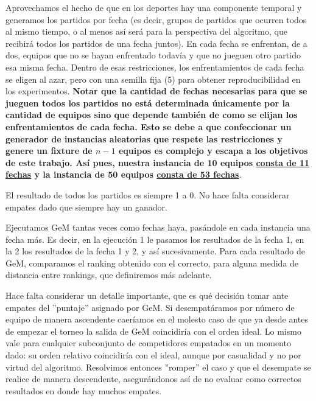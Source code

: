 \begin{LaTeXdescription}
        \par Aprovechamos el hecho de que en los deportes hay una componente
        temporal y generamos los partidos por fecha (es decir, grupos de
        partidos que ocurren todos al mismo tiempo, o al menos as\'i ser\'a para
        la perspectiva del algoritmo, que recibir\'a todos los partidos de una
        fecha juntos). En cada fecha se enfrentan, de a dos, equipos que no se
        hayan enfrentado todav\'ia y que no jueguen otro partido esa misma
        fecha. Dentro de esas restricciones, los enfrentamientos de cada fecha
        se eligen al azar, pero con una semilla fija (5) para obtener
        reproducibilidad en los experimentos. \textbf{Notar que la cantidad de
        fechas necesarias para que se jueguen todos los partidos no est\'a
        determinada \'unicamente por la cantidad de equipos sino que depende
        tambi\'en de como se elijan los enfrentamientos de cada fecha. Esto se
        debe a que confeccionar un generador de instancias aleatorias que
        respete las restricciones y genere un fixture de $n-1$ equipos es
        complejo y escapa a los objetivos de este trabajo. As\'i pues, nuestra
        instancia de 10 equipos \underline{consta de 11 fechas} y la instancia
        de 50 equipos \underline{consta de 53 fechas}}.

        \par El resultado de todos los partidos es siempre 1 a 0. No hace falta
        considerar empates dado que siempre hay un ganador.
        
        \par Ejecutamos
        GeM tantas veces como fechas haya, pas\'andole en cada instancia una
        fecha m\'as. Es decir, en la ejecuci\'on 1 le pasamos los resultados de
        la fecha 1, en la 2 los resultados de la fecha 1 y 2, y as\'i
        sucesivamente. Para cada resultado de GeM, comparamos el ranking
        obtenido con el correcto, para alguna medida de distancia entre
        rankings, que definiremos m\'as adelante.

        \par Hace falta considerar un detalle importante, que es qu\'e
        decisi\'on tomar ante empates del ''puntaje'' asignado por GeM. Si
        desempat\'aramos por n\'umero de equipo de manera ascendente caer\'iamos
        en el molesto caso de que ya desde antes de empezar el torneo la salida
        de GeM coincidir\'ia con el orden ideal. Lo mismo vale para cualquier
        subconjunto de competidores empatados en un momento dado: su orden
        relativo coincidir\'ia con el ideal, aunque por casualidad y no por
        virtud del algoritmo. Resolvimos entonces ''romper'' el caso y que el
        desempate se realice de manera descendente, asegur\'andonos as\'i de no
        evaluar como correctos resultados en donde hay muchos empates.


\end{LaTeXdescription}
